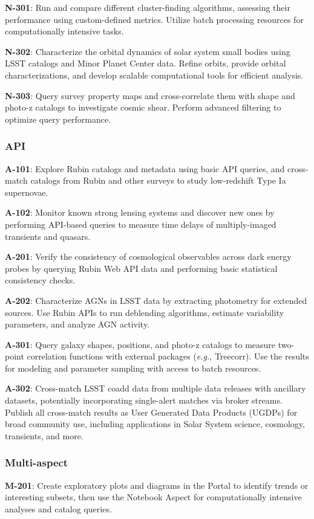 \textbf{N-301}: Run and compare different cluster-finding algorithms, assessing their performance using custom-defined metrics. Utilize batch processing resources for computationally intensive tasks.

\textbf{N-302}: Characterize the orbital dynamics of solar system small bodies using LSST catalogs and Minor Planet Center data.
Refine orbits, provide orbital characterizations, and develop scalable computational tools for efficient analysis.

\textbf{N-303}: Query survey property maps and cross-correlate them with shape and photo-z catalogs to investigate cosmic shear. Perform advanced filtering to optimize query performance.

\subsubsection{API}

\textbf{A-101}: Explore Rubin catalogs and metadata using basic API queries, and cross-match catalogs from Rubin and other surveys to study low-redshift Type Ia supernovae.

\textbf{A-102}: Monitor known strong lensing systems and discover new ones by performing API-based queries to measure time delays of multiply-imaged transients and quasars.

\textbf{A-201}: Verify the consistency of cosmological observables across dark energy probes by querying Rubin Web API data and performing basic statistical consistency checks.

\textbf{A-202}: Characterize AGNs in LSST data by extracting photometry for extended sources. Use Rubin APIs to run deblending algorithms, estimate variability parameters, and analyze AGN activity.

\textbf{A-301}: Query galaxy shapes, positions, and photo-z catalogs to measure two-point correlation functions with external packages (\emph{e.g.}, Treecorr).
Use the results for modeling and parameter sampling with access to batch resources.

\textbf{A-302}: Cross-match LSST coadd data from multiple data releases with ancillary datasets, potentially incorporating single-alert matches via broker streams.
Publish all cross-match results as User Generated Data Products (UGDPs) for broad community use, including applications in Solar System science, cosmology, transients, and more.

\subsubsection{Multi-aspect}

\textbf{M-201}: Create exploratory plots and diagrams in the Portal to identify trends or interesting subsets, then use the Notebook Aspect for computationally intensive analyses and catalog queries.
